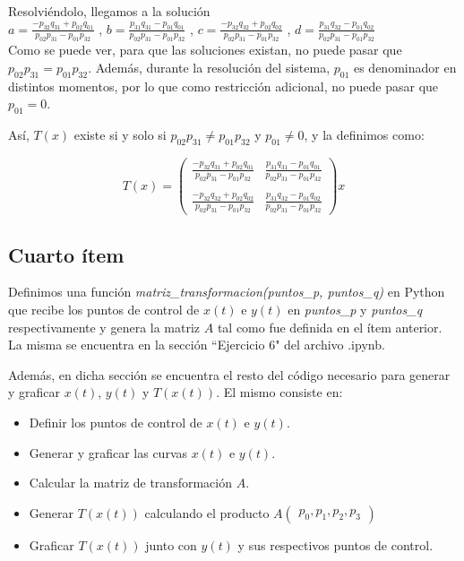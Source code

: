 \documentclass{article}
\begin{document}
Resolviéndolo, llegamos a la solución \\

$a = \frac{-p_{32}q_{31} + p_{02}q_{01}}{p_{02}p_{31} - p_{01}p_{32}} $ , $b = \frac{p_{31}q_{31} - p_{01}q_{01}}{p_{02}p_{31} - p_{01}p_{32}} $ , $c = \frac{-p_{32}q_{32} + p_{02}q_{02}}{p_{02}p_{31} - p_{01}p_{32}} $ , $d = \frac{p_{31}q_{32} - p_{01}q_{02}}{p_{02}p_{31} - p_{01}p_{32}} $ \\

Como se puede ver, para que las soluciones existan, no puede pasar que $p_{02}p_{31} = p_{01}p_{32}$. Además, durante la resolución del sistema, $p_{01}$ es denominador en distintos momentos, por lo que como restricción adicional, no puede pasar  que $p_{01} = 0$.

Así, $T(x)$ existe si y solo si $p_{02}p_{31} \neq p_{01}p_{32}$ y $p_{01} \neq 0$, y la definimos como:

$$ T(x) = 
\begin{pmatrix}
\frac{-p_{32}q_{31} + p_{02}q_{01}}{p_{02}p_{31} - p_{01}p_{32}} & \frac{p_{31}q_{31} - p_{01}q_{01}}{p_{02}p_{31} - p_{01}p_{32}}\\
\\
\frac{-p_{32}q_{32} + p_{02}q_{02}}{p_{02}p_{31} - p_{01}p_{32}} & \frac{p_{31}q_{32} - p_{01}q_{02}}{p_{02}p_{31} - p_{01}p_{32}}
\end{pmatrix}
x
$$

\subsection*{Cuarto ítem}
Definimos una función \textit{matriz\_transformacion(puntos\_p, puntos\_q)} en Python que recibe los puntos de control de $x(t)$ e $y(t)$ en \textit{puntos\_p} y \textit{puntos\_q} respectivamente y genera la matriz $A$ tal como fue definida en el ítem anterior. La misma se encuentra en la sección ``Ejercicio 6" del archivo .ipynb. 

Además, en dicha sección se encuentra el resto del código necesario para generar y graficar $x(t)$, $y(t)$ y $T(x(t))$. El mismo consiste en:
\begin{itemize}
    \item Definir los puntos de control de $x(t)$ e $y(t)$.
    \item Generar y graficar las curvas $x(t)$ e $y(t)$.
    \item Calcular la matriz de transformación $A$.
    \item Generar $T(x(t))$ calculando el producto $A\begin{pmatrix}p_0, p_1, p_2, p_3 \end{pmatrix}$
    \item Graficar $T(x(t))$ junto con $y(t)$ y sus respectivos puntos de control.
\end{itemize}
\end{document}
